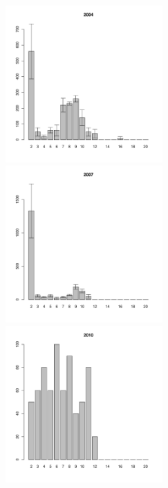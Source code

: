 	\begin{figure}[hp]

	\begin{minipage}[b]{.3\linewidth}
	\begin{center}
	\includegraphics[width=60mm]{../White_Sea/Luvenga_Goreliy/middle2_2004_.pdf}
	\end{center}
	\end{minipage}
	\hfill
	\begin{minipage}[b]{.3\linewidth}
	\begin{center}
	\includegraphics[width=60mm]{../White_Sea/Luvenga_Goreliy/middle2_2007_.pdf}
	\end{center}
	\end{minipage}
	\hfill
	\begin{minipage}[b]{.3\linewidth}
	\begin{center}
	\includegraphics[width=60mm]{../White_Sea/Luvenga_Goreliy/middle2_2010_.pdf}

\end{center}
\end{minipage}
\end{figure}
